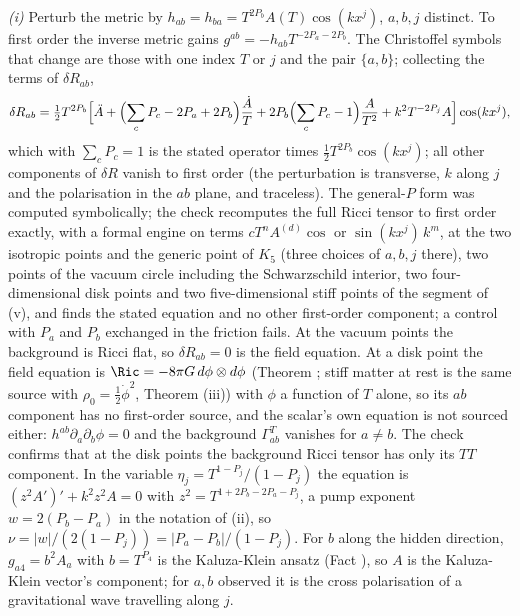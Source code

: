 \emph{(i)} Perturb the metric by $h_{ab} = h_{ba} = T^{2P_{b}}A(T)\cos(kx^{j})$, $a, b, j$ distinct. To first order the inverse metric gains $g^{ab} = -h_{ab}T^{-2P_{a} - 2P_{b}}$. The Christoffel symbols that change are those with one index $T$ or $j$ and the pair $\{a, b\}$; collecting the terms of $\delta R_{ab}$,
\[
\delta R_{ab} = \tfrac12 T^{2P_{b}}\Bigl[\ddot A + \Bigl(\sum_{c}P_{c} - 2P_{a} + 2P_{b}\Bigr)\frac{\dot A}{T} + 2P_{b}\Bigl(\sum_{c}P_{c} - 1\Bigr)\frac{A}{T^{2}} + k^{2}T^{-2P_{j}}A\Bigr]\cos(kx^{j}),
\]
which with $\sum_{c}P_{c} = 1$ is the stated operator times $\tfrac12 T^{2P_{b}}\cos(kx^{j})$; all other components of $\delta R$ vanish to first order (the perturbation is transverse, $k$ along $j$ and the polarisation in the $ab$ plane, and traceless). The general-$P$ form was computed symbolically; the check recomputes the full Ricci tensor to first order exactly, with a formal engine on terms $cT^{n}A^{(d)}\cos$ or $\sin(kx^{j})\,k^{m}$, at the two isotropic points and the generic point of $K_{5}$ (three choices of $a, b, j$ there), two points of the vacuum circle including the Schwarzschild interior, two four-dimensional disk points and two five-dimensional stiff points of the segment of (v), and finds the stated equation and no other first-order component; a control with $P_{a}$ and $P_{b}$ exchanged in the friction fails. At the vacuum points the background is Ricci flat, so $\delta R_{ab} = 0$ is the field equation. At a disk point the field equation is $\Ric = -8\pi G\,d\phi\otimes d\phi$ (Theorem ; stiff matter at rest is the same source with $\rho_{0} = \tfrac12\dot\phi^{2}$, Theorem (iii)) with $\phi$ a function of $T$ alone, so its $ab$ component has no first-order source, and the scalar's own equation is not sourced either: $h^{ab}\partial_{a}\partial_{b}\phi = 0$ and the background $\Gamma^{T}_{ab}$ vanishes for $a \ne b$. The check confirms that at the disk points the background Ricci tensor has only its $TT$ component. In the variable $\eta_{j} = T^{1 - P_{j}}/(1 - P_{j})$ the equation is $(z^{2}A')' + k^{2}z^{2}A = 0$ with $z^{2} = T^{1 + 2P_{b} - 2P_{a} - P_{j}}$, a pump exponent $w = 2(P_{b} - P_{a})$ in the notation of (ii), so $\nu = |w|/(2(1 - P_{j})) = |P_{a} - P_{b}|/(1 - P_{j})$. For $b$ along the hidden direction, $g_{a4} = b^{2}A_{a}$ with $b = T^{P_{4}}$ is the Kaluza-Klein ansatz (Fact ), so $A$ is the Kaluza-Klein vector's component; for $a, b$ observed it is the cross polarisation of a gravitational wave travelling along $j$.

